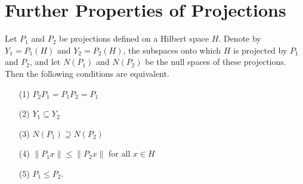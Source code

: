 \section{Further Properties of Projections}

\begin{theorem}\label{9.6-1}
    Let \( {P}_{1}  \) and \( {P}_{2} \) be projections defined on a Hilbert space \( H  \). Denote by \( {Y}_{1} = {P}_{1}(H) \) and \( {Y}_{2} = {P}_{2}(H) \), the subspaces onto which \( H  \) is projected by \( {P}_{1} \) and \( {P}_{2} \), and let \( N({P}_{1}) \) and \( N({P}_{2}) \) be the null spaces of these projections. Then the following conditions are equivalent.
    \begin{enumerate}
        \item[(1)] \( {P}_{2}{P}_{1} = {P}_{1} {P}_{2} = {P}_{1} \)
        \item[(2)] \( {Y}_{1} \subseteq {Y}_{2} \)
        \item[(3)] \( N({P}_{1}) \supseteq N({P}_{2}) \)
        \item[(4)] \( \|{P}_{1}x\| \leq \|{P}_{2}x \|  \) for all \( x \in H  \)
        \item[(5)] \( {P}_{1} \leq {P}_{2} \).
    \end{enumerate}
\end{theorem}
